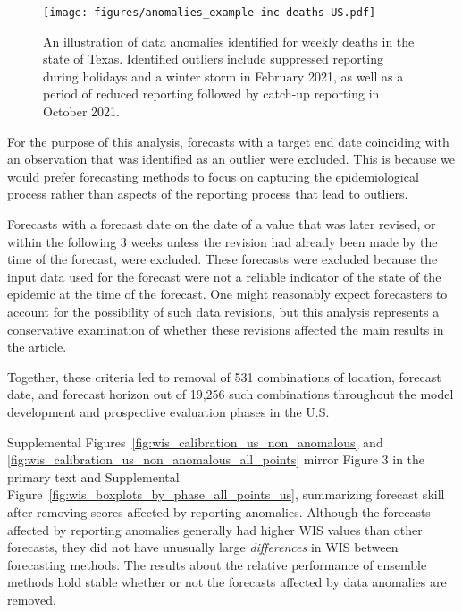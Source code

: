 \documentclass{article}
\begin{document}
\begin{figure}
  \texttt{[image: figures/anomalies\_example-inc-deaths-US.pdf]}
  \caption{An illustration of data anomalies identified for weekly deaths in the state of Texas. Identified outliers include suppressed reporting during holidays and a winter storm in February 2021, as well as a period of reduced reporting followed by catch-up reporting in October 2021.}
  \label{fig:anomalies_example}
\end{figure}

For the purpose of this analysis, forecasts with a target end date coinciding with an observation that was identified as an outlier were excluded. This is because we would prefer forecasting methods to focus on capturing the epidemiological process rather than aspects of the reporting process that lead to outliers.

Forecasts with a forecast date on the date of a value that was later revised, or within the following 3 weeks unless the revision had already been made by the time of the forecast, were excluded. These forecasts were excluded because the input data used for the forecast were not a reliable indicator of the state of the epidemic at the time of the forecast. One might reasonably expect forecasters to account for the possibility of such data revisions, but this analysis represents a conservative examination of whether these revisions affected the main results in the article.

Together, these criteria led to removal of 531 combinations of location, forecast date, and forecast horizon out of 19,256 such combinations throughout the model development and prospective evaluation phases in the U.S.

Supplemental Figures~\ref{fig:wis_calibration_us_non_anomalous} and \ref{fig:wis_calibration_us_non_anomalous_all_points} mirror Figure 3 in the primary text and Supplemental Figure~\ref{fig:wis_boxplots_by_phase_all_points_us}, summarizing forecast skill after removing scores affected by reporting anomalies. Although the forecasts affected by reporting anomalies generally had higher WIS values than other forecasts, they did not have unusually large \textit{differences} in WIS between forecasting methods. The results about the relative performance of ensemble methods hold stable whether or not the forecasts affected by data anomalies are removed.

\newpage
\end{document}
